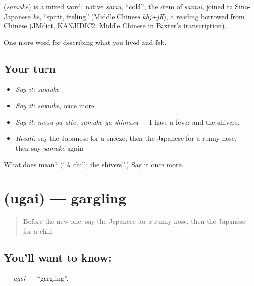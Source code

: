 \begin{cousinweb}
\textbf{} (\emph{samuke}) is a mixed word: native \emph{samu}, \textquotedblleft{}cold\textquotedblright{}, the stem of \emph{samui}, joined to Sino-Japanese \emph{ke}, \textquotedblleft{}spirit, feeling\textquotedblright{} (Middle Chinese \emph{khj+jH}), a reading borrowed from Chinese (JMdict, KANJIDIC2; Middle Chinese in Baxter's transcription).
\end{cousinweb}

\begin{grammarlens}[title={What you've built}]
One more word for describing what you lived and felt.
\end{grammarlens}

\subsection*{Your turn}
\begin{itemize}
\raggedright
  \item \emph{Say it:} \emph{samuke}
  \item \emph{Say it:} \emph{samuke}, once more
  \item \emph{Say it:} \emph{netsu ga atte, samuke ga shimasu} — I have a fever and the shivers.
  \item \emph{Recall:} say the Japanese for a sneeze, then the Japanese for a runny nose, then say \emph{samuke} again
\end{itemize}

\begin{tcolorbox}[breakable,colback=teal!4,colframe=teal!35!black,title={Before you move on}]
What does  mean? (\textquotedblleft{}A chill; the shivers\textquotedblright{}.) Say it once more.
\end{tcolorbox}
\section[\texorpdfstring{\ja{うがい} (ugai)}{うがい (ugai)}]{ (ugai) — gargling}

\label{lesson:JA-C446-ugai}



\begin{quote}
Before the new one: say the Japanese for a runny nose, then the Japanese for a chill.
\end{quote}

\subsection*{You'll want to know: }
\textbf{} — \emph{ugai} — \textquotedblleft{}gargling\textquotedblright{}.

